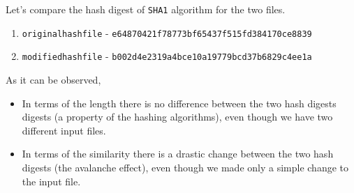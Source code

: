 \documentclass[11pt,letterpaper]{article}
\newenvironment{answer}{\em \color{blue} \begin{adjustwidth}{1cm}{1cm}}{\end{adjustwidth}}
\begin{document}
\begin{enumerate}
		\begin{answer}
			Let's compare the hash digest of {\tt SHA1} algorithm for the two files.
			\begin{enumerate}
				\item {\tt originalhashfile} - {\tt e64870421f78773bf65437f515fd384170ce8839}
				\item {\tt modifiedhashfile} - {\tt b002d4e2319a4bce10a19779bcd37b6829c4ee1a}
			\end{enumerate}
		
			As it can be observed, 
			\begin{itemize}
				\item 	In terms of the length there is no difference between the two hash digests digests (a property of the hashing algorithms), even though we have two different input files.
				
				\item In terms of the similarity there is a drastic change between the two hash digests (the avalanche effect), even though we made only a simple change to the input file.
			\end{itemize}

		\end{answer}
		
		
	\end{enumerate}
\end{document}
